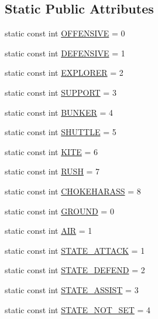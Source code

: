 \subsection*{Static Public Attributes}
\begin{DoxyCompactItemize}
\item 
static const int \hyperlink{class_squad_ac629d438d6297bb1fe40f33e90741553}{O\-F\-F\-E\-N\-S\-I\-V\-E} = 0
\item 
static const int \hyperlink{class_squad_a1c3ca5859f0f3738d609a5f95ba04a6f}{D\-E\-F\-E\-N\-S\-I\-V\-E} = 1
\item 
static const int \hyperlink{class_squad_a0840d63949a8301743d9b21cbb99abc7}{E\-X\-P\-L\-O\-R\-E\-R} = 2
\item 
static const int \hyperlink{class_squad_a76a852c62242a800efe90ea38aa1fb5e}{S\-U\-P\-P\-O\-R\-T} = 3
\item 
static const int \hyperlink{class_squad_acbf1c634b1d198828b8badb96039c1a0}{B\-U\-N\-K\-E\-R} = 4
\item 
static const int \hyperlink{class_squad_a54980204b8f391319378a8090639e897}{S\-H\-U\-T\-T\-L\-E} = 5
\item 
static const int \hyperlink{class_squad_af6cce24e22d96f4aa9d59e71083b7ace}{K\-I\-T\-E} = 6
\item 
static const int \hyperlink{class_squad_a866b266f0f5b4fb8099d7ea83b2163b3}{R\-U\-S\-H} = 7
\item 
static const int \hyperlink{class_squad_a296c744bac8fae201bb3f1e9c222907f}{C\-H\-O\-K\-E\-H\-A\-R\-A\-S\-S} = 8
\item 
static const int \hyperlink{class_squad_a01e00ec7576957ee38d4b5af61144ef6}{G\-R\-O\-U\-N\-D} = 0
\item 
static const int \hyperlink{class_squad_ad33fd78a46d5a68af5d9b36c2faf2620}{A\-I\-R} = 1
\item 
static const int \hyperlink{class_squad_a649cd577ebc44798880b81df7b28d189}{S\-T\-A\-T\-E\-\_\-\-A\-T\-T\-A\-C\-K} = 1
\item 
static const int \hyperlink{class_squad_aafe6f8e836a02ede7e9a88bc335c6644}{S\-T\-A\-T\-E\-\_\-\-D\-E\-F\-E\-N\-D} = 2
\item 
static const int \hyperlink{class_squad_ace3e1c2898e4e91a1bd5ea8f748cd904}{S\-T\-A\-T\-E\-\_\-\-A\-S\-S\-I\-S\-T} = 3
\item 
static const int \hyperlink{class_squad_a045ef512b08228c6a03b92258f957e45}{S\-T\-A\-T\-E\-\_\-\-N\-O\-T\-\_\-\-S\-E\-T} = 4
\end{DoxyCompactItemize}
